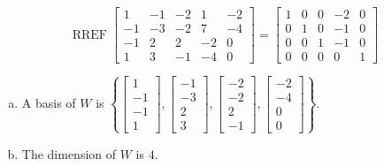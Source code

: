 \begin{exerciseAnswer} 


\[\operatorname{RREF} \left[\begin{array}{ccccc}
1 & -1 & -2 & 1 & -2 \\
-1 & -3 & -2 & 7 & -4 \\
-1 & 2 & 2 & -2 & 0 \\
1 & 3 & -1 & -4 & 0
\end{array}\right] = \left[\begin{array}{ccccc}
1 & 0 & 0 & -2 & 0 \\
0 & 1 & 0 & -1 & 0 \\
0 & 0 & 1 & -1 & 0 \\
0 & 0 & 0 & 0 & 1
\end{array}\right] \]


\begin{enumerate}[(a)]
\item A basis of \(W\) is \( \left\{ \left[\begin{array}{c}
1 \\
-1 \\
-1 \\
1
\end{array}\right] , \left[\begin{array}{c}
-1 \\
-3 \\
2 \\
3
\end{array}\right] , \left[\begin{array}{c}
-2 \\
-2 \\
2 \\
-1
\end{array}\right] , \left[\begin{array}{c}
-2 \\
-4 \\
0 \\
0
\end{array}\right] \right\} \).
\item The dimension of \(W\) is \( 4 \).
\end{enumerate}
    
\end{exerciseAnswer}
    
